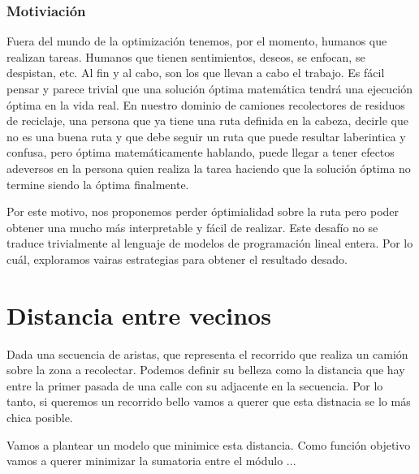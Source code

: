 \subsubsection{Motiviación}

Fuera del mundo de la optimización tenemos, por el momento, humanos que realizan tareas. 
Humanos que tienen sentimientos, deseos, se enfocan, se despistan, etc. Al fin y al cabo,
son los que llevan a cabo el trabajo. Es fácil pensar y parece trivial que una solución
óptima matemática tendrá una ejecución óptima en la vida real. En nuestro dominio de 
camiones recolectores de residuos de reciclaje, una persona que ya tiene una ruta definida
en la cabeza, decirle que no es una buena ruta y que debe seguir un ruta que puede resultar
laberintica y confusa, pero óptima matemáticamente hablando, puede llegar a tener efectos
adeversos en la persona quien realiza la tarea haciendo que la solución óptima no termine
siendo la óptima finalmente.

\vspace{3mm}

Por este motivo, nos proponemos perder óptimialidad sobre la ruta pero poder obtener
una mucho más interpretable y fácil de realizar. Este desafío no se traduce trivialmente
al lenguaje de modelos de programación lineal entera. Por lo cuál, exploramos vairas estrategias
para obtener el resultado desado.

\section{Distancia entre vecinos}

Dada una secuencia de aristas, que representa el recorrido que realiza un camión sobre la zona a 
recolectar. Podemos definir su belleza como la distancia que hay entre la primer pasada de una calle
con su adjacente en la secuencia. Por lo tanto, si queremos un recorrido bello vamos a querer que esta 
distnacia se lo más chica posible.

\vspace{3mm}

Vamos a plantear un modelo que minimice esta distancia. Como función objetivo vamos a querer minimizar
la sumatoria entre el módulo ...
